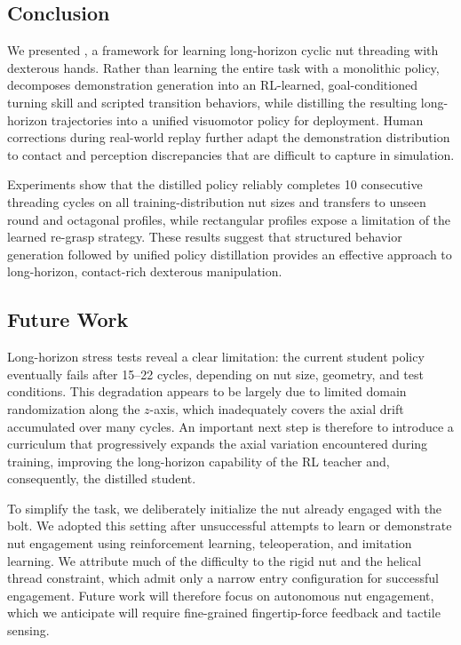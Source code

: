 
\subsection{Conclusion}

We presented \methodname, a framework for learning long-horizon cyclic nut
threading with dexterous hands. Rather than learning the entire task with a
monolithic policy, \methodname decomposes demonstration generation into an
RL-learned, goal-conditioned turning skill and scripted transition behaviors,
while distilling the resulting long-horizon trajectories into a unified
visuomotor policy for deployment. Human corrections during real-world replay
further adapt the demonstration distribution to contact and perception
discrepancies that are difficult to capture in simulation.

Experiments show
that the distilled policy reliably completes 10 consecutive threading cycles
on all training-distribution nut sizes and transfers to unseen round and
octagonal profiles, while rectangular profiles expose a limitation of the
learned re-grasp strategy. These results suggest that structured behavior
generation followed by unified policy distillation provides an effective
approach to long-horizon, contact-rich dexterous manipulation.

\subsection{Future Work}

Long-horizon stress tests reveal a clear limitation: the current student
policy eventually fails after 15--22 cycles, depending on nut size, geometry,
and test conditions. This degradation appears to be largely due to limited
domain randomization along the $z$-axis, which inadequately covers the axial drift
accumulated over many cycles. An important next step is therefore to introduce
a curriculum that progressively expands the axial variation encountered
during training, improving the long-horizon capability of the RL teacher and,
consequently, the distilled student.

To simplify the task, we deliberately initialize the nut already engaged with
the bolt. We adopted this setting after unsuccessful attempts to learn or
demonstrate nut engagement using reinforcement learning, teleoperation, and
imitation learning. We attribute much of the difficulty to the rigid nut and
the helical thread constraint, which admit only a narrow entry configuration
for successful engagement. Future work will therefore focus on autonomous nut
engagement, which we anticipate will require fine-grained fingertip-force
feedback and tactile sensing.

